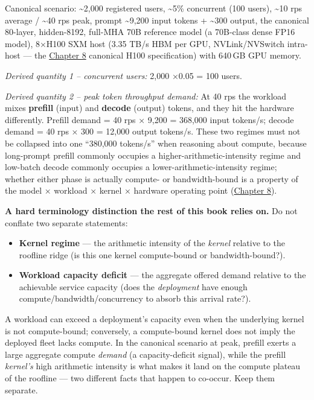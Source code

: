 Canonical scenario: \textasciitilde2,000 registered users,
\textasciitilde5\% concurrent (100 users), \textasciitilde10 rps average
/ \textasciitilde40 rps peak, prompt \textasciitilde9,200 input tokens +
\textasciitilde300 output, the canonical 80-layer, hidden-8192, full-MHA
70B reference model (a 70B-class dense FP16 model), 8×H100 SXM host
(3.35 TB/s HBM per GPU, NVLink/NVSwitch intra-host --- the \hyperref[chap:8]{Chapter 8}
canonical H100 specification) with 640\,GB GPU memory.

\emph{Derived quantity 1 -- concurrent users:} 2,000 ×0.05 = 100 users.

\emph{Derived quantity 2 -- peak token throughput demand:} At 40 rps the
workload mixes \textbf{prefill} (input) and \textbf{decode} (output)
tokens, and they hit the hardware differently. Prefill demand = 40 rps ×
9,200 = 368,000 input tokens/s; decode demand = 40 rps × 300 = 12,000
output tokens/s. These two regimes must not be collapsed into one
``380,000 tokens/s'' when reasoning about compute, because long-prompt
prefill commonly occupies a higher-arithmetic-intensity regime and
low-batch decode commonly occupies a lower-arithmetic-intensity regime;
whether either phase is actually compute- or bandwidth-bound is a
property of the model × workload × kernel × hardware operating point
(\hyperref[chap:8]{Chapter 8}).

\textbf{A hard terminology distinction the rest of this book relies on.}
Do not conflate two separate statements:

\begin{itemize}
\tightlist
\item
  \textbf{Kernel regime} --- the arithmetic intensity of the
  \emph{kernel} relative to the roofline ridge (is this one kernel
  compute-bound or bandwidth-bound?).
\item
  \textbf{Workload capacity deficit} --- the aggregate offered demand
  relative to the achievable service capacity (does the
  \emph{deployment} have enough compute/bandwidth/concurrency to absorb
  this arrival rate?).
\end{itemize}

A workload can exceed a deployment's capacity even when the underlying
kernel is not compute-bound; conversely, a compute-bound kernel does not
imply the deployed fleet lacks compute. In the canonical scenario at
peak, prefill exerts a large aggregate compute \emph{demand} (a
capacity-deficit signal), while the prefill \emph{kernel's} high
arithmetic intensity is what makes it land on the compute plateau of the
roofline --- two different facts that happen to co-occur. Keep them
separate.

